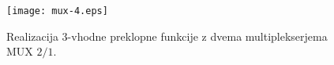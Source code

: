 \begin{resitev}
\begin{figure}[ht]
\centering
\texttt{[image: mux-4.eps]}
\caption{Realizacija 3-vhodne preklopne funkcije z dvema multiplekserjema MUX $2/1$.}
\label{fig:mux_zgled_3}
\end{figure}

\end{resitev}

%
%
%
%
